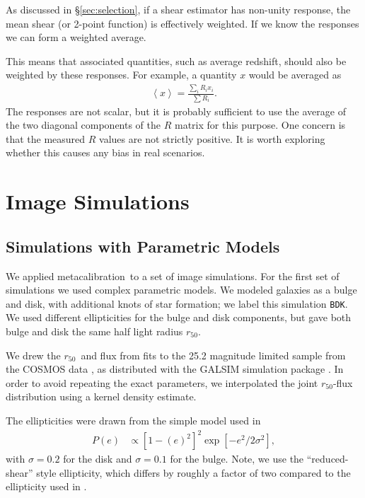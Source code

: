 \documentclass[a4paper,fleqn,usenatbib]{mnras}
\newcommand{\hlr}{$r_{50}$}
\newcommand{\mcal}{metacalibration}
\newcommand{\bdsim}{\texttt{BDK}}
\begin{document}
As discussed in \S \ref{sec:selection}, if a shear estimator has
non-unity response, the mean shear (or 2-point function) is effectively
weighted.  If we know the responses we can form a weighted average.

This means that associated quantities, such as average redshift, should also be
weighted by these responses.  For example, a quantity $x$ would be averaged
as
\begin{align}
    \left< x \right> = \frac{\sum_i R_i x_i}{\sum R_i}.
\end{align}
The responses are not scalar, but it is probably sufficient
to use the average of the two diagonal components of the $R$ matrix
for this purpose. One concern is that the measured $R$ values are not
strictly positive.  It is worth exploring whether this causes
any bias in real scenarios.

\section{Image Simulations} \label{sec:sims}

\subsection{Simulations with Parametric Models} \label{sec:bdsim}

We applied \mcal\ to a set of image simulations.  For the first set of
simulations we used complex parametric models.  We modeled galaxies as a bulge
and disk, with additional knots of star formation; we label this simulation
\bdsim.  We used different ellipticities for the bulge and disk components, but
gave both bulge and disk the same half light radius \hlr.

We drew the \hlr\ and flux from fits \citep{LacknerGunn2012} to the 25.2
magnitude limited sample from the COSMOS data
\citep{Scoville2007a,Scoville2007b}, as distributed with the GALSIM simulation
package \citep{GALSIM2015}.  In order to avoid repeating the exact parameters,
we interpolated the joint \hlr-flux distribution using a kernel density
estimate.

The ellipticities were drawn from the simple model used in \cite{ba14}
\begin{align}
    P(e) &\propto \left[1-(e)^2\right]^2 \exp\left[-e^2/2\sigma^2\right],
\end{align}
with $\sigma=0.2$ for the disk and $\sigma=0.1$ for the bulge.  Note, we use
the ``reduced-shear'' style ellipticity, which differs by roughly a factor of
two compared to the ellipticity used in \citet{bfd2016}.
\end{document}
